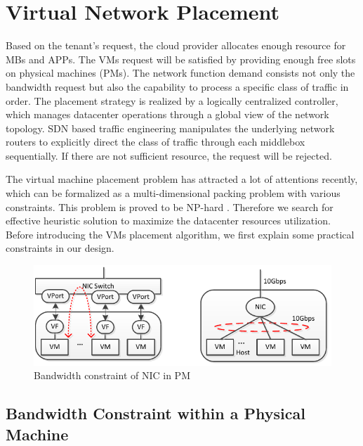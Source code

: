 \documentclass[10pt, conference, letterpaper]{IEEEtran}
\begin{document}

\section{Virtual Network Placement}\label{sec:algorithm}
Based on the tenant's request, the cloud provider allocates enough resource for MBs and APPs. The VMs request will be satisfied by providing enough free slots on physical machines (PMs). The network function demand consists not only the bandwidth request but also the capability to process a specific class of traffic in order. The placement strategy is realized by a logically centralized controller, which manages datacenter operations through a global view of the network topology. SDN based traffic engineering manipulates the underlying network routers to explicitly direct the class of traffic through each middlebox sequentially. If there are not sufficient resource, the request will be rejected. 


The virtual machine placement problem has attracted a lot of attentions recently, which can be formalized as a multi-dimensional packing problem with various constraints. This problem is proved to be NP-hard \cite{packing, fischer2013virtual}. Therefore we search for effective heuristic solution to maximize the datacenter resources utilization. Before introducing the VMs placement algorithm, we first explain some practical constraints in our design.

\begin{figure}
	\centering
		\includegraphics[width=3.5 in]{fig/nic.pdf}
	\caption{Bandwidth constraint of NIC in PM}
	\label{fig:nic}
\end{figure}

\subsection{Bandwidth Constraint within a Physical Machine}
\end{document}
